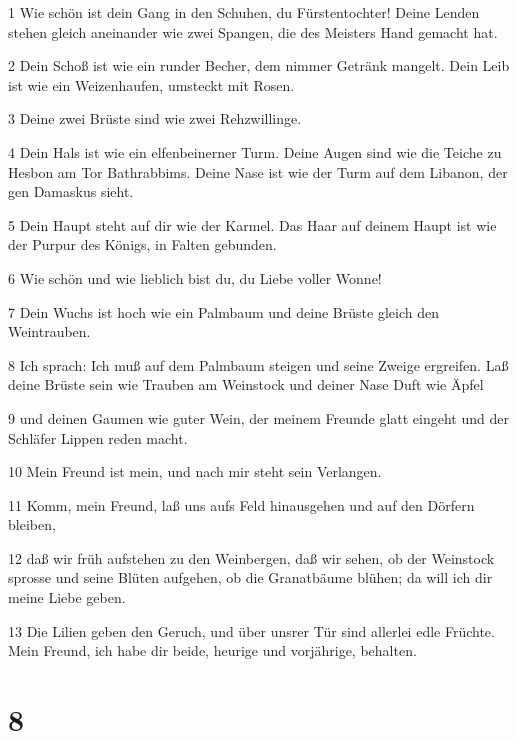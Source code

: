 \par 1 Wie schön ist dein Gang in den Schuhen, du Fürstentochter! Deine Lenden stehen gleich aneinander wie zwei Spangen, die des Meisters Hand gemacht hat.
\par 2 Dein Schoß ist wie ein runder Becher, dem nimmer Getränk mangelt. Dein Leib ist wie ein Weizenhaufen, umsteckt mit Rosen.
\par 3 Deine zwei Brüste sind wie zwei Rehzwillinge.
\par 4 Dein Hals ist wie ein elfenbeinerner Turm. Deine Augen sind wie die Teiche zu Hesbon am Tor Bathrabbims. Deine Nase ist wie der Turm auf dem Libanon, der gen Damaskus sieht.
\par 5 Dein Haupt steht auf dir wie der Karmel. Das Haar auf deinem Haupt ist wie der Purpur des Königs, in Falten gebunden.
\par 6 Wie schön und wie lieblich bist du, du Liebe voller Wonne!
\par 7 Dein Wuchs ist hoch wie ein Palmbaum und deine Brüste gleich den Weintrauben.
\par 8 Ich sprach: Ich muß auf dem Palmbaum steigen und seine Zweige ergreifen. Laß deine Brüste sein wie Trauben am Weinstock und deiner Nase Duft wie Äpfel
\par 9 und deinen Gaumen wie guter Wein, der meinem Freunde glatt eingeht und der Schläfer Lippen reden macht.
\par 10 Mein Freund ist mein, und nach mir steht sein Verlangen.
\par 11 Komm, mein Freund, laß uns aufs Feld hinausgehen und auf den Dörfern bleiben,
\par 12 daß wir früh aufstehen zu den Weinbergen, daß wir sehen, ob der Weinstock sprosse und seine Blüten aufgehen, ob die Granatbäume blühen; da will ich dir meine Liebe geben.
\par 13 Die Lilien geben den Geruch, und über unsrer Tür sind allerlei edle Früchte. Mein Freund, ich habe dir beide, heurige und vorjährige, behalten.

\chapter{8}

